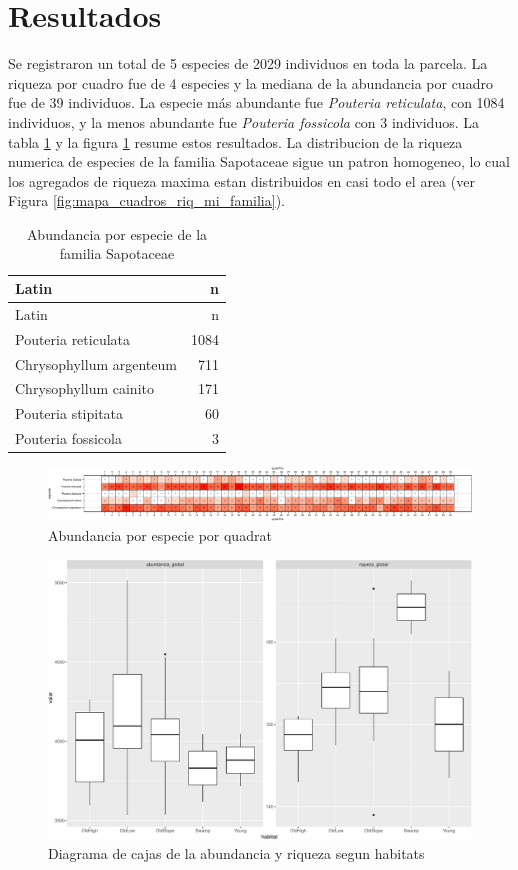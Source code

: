 \documentclass[11pt,]{article}
\begin{document}
\section{Resultados}\label{resultados}

Se registraron un total de 5 especies de 2029 individuos en toda la
parcela. La riqueza por cuadro fue de 4 especies y la mediana de la
abundancia por cuadro fue de 39 individuos. La especie más abundante fue
\emph{Pouteria reticulata}, con 1084 individuos, y la menos abundante
fue \emph{Pouteria fossicola} con 3 individuos. La tabla
\ref{tab:abun_sp} y la figura \ref{fig:abun_sp_q} resume estos
resultados. La distribucion de la riqueza numerica de especies de la
familia Sapotaceae sigue un patron homogeneo, lo cual los agregados de
riqueza maxima estan distribuidos en casi todo el area (ver Figura
\ref{fig:mapa_cuadros_riq_mi_familia}).

\begin{longtable}[]{@{}lr@{}}
\caption{\label{tab:abun_sp}Abundancia por especie de la familia
Sapotaceae}\tabularnewline
\toprule
Latin & n\tabularnewline
\midrule
\endfirsthead
\toprule
Latin & n\tabularnewline
\midrule
\endhead
Pouteria reticulata & 1084\tabularnewline
Chrysophyllum argenteum & 711\tabularnewline
Chrysophyllum cainito & 171\tabularnewline
Pouteria stipitata & 60\tabularnewline
Pouteria fossicola & 3\tabularnewline
\bottomrule
\end{longtable}

\begin{figure}
\centering
\includegraphics{manuscrito_files/figure-latex/unnamed-chunk-3-1.pdf}
\caption{\label{fig:abun_sp_q}Abundancia por especie por quadrat}
\end{figure}

\begin{figure}
\centering
\includegraphics{manuscrito_files/figure-latex/unnamed-chunk-4-1.pdf}
\caption{\label{fig:P13}Diagrama de cajas de la abundancia y riqueza
segun habitats}
\end{figure}
\end{document}
